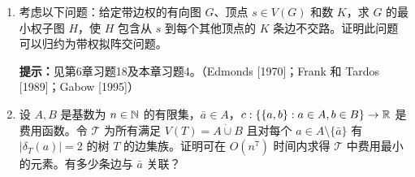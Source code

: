 \begin{enumerate}[label=\arabic*.,start=24]
\item 考虑以下问题：给定带边权的有向图 $G$、顶点 $s\in V(G)$ 和数 $K$，求 $G$ 的最小权子图 $H$，使 $H$ 包含从 $s$ 到每个其他顶点的 $K$ 条边不交路。证明此问题可以归约为带权拟阵交问题。\par
\textbf{提示：}见第6章习题18及本章习题4。（Edmonds [1970]；Frank 和 Tardos [1989]；Gabow [1995]）
\item 设 $A,B$ 是基数为 $n\in\mathbb N$ 的有限集，$\bar a\in A$，$c:\{\{a,b\}:a\in A,b\in B\}\to\mathbb R$ 是费用函数。令 $\mathcal T$ 为所有满足 $V(T)=A\mathbin{\dot\cup}B$ 且对每个 $a\in A\setminus\{\bar a\}$ 有 $|\delta_T(a)|=2$ 的树 $T$ 的边集族。证明可在 $O(n^7)$ 时间内求得 $\mathcal T$ 中费用最小的元素。有多少条边与 $\bar a$ 关联？
\end{enumerate}



